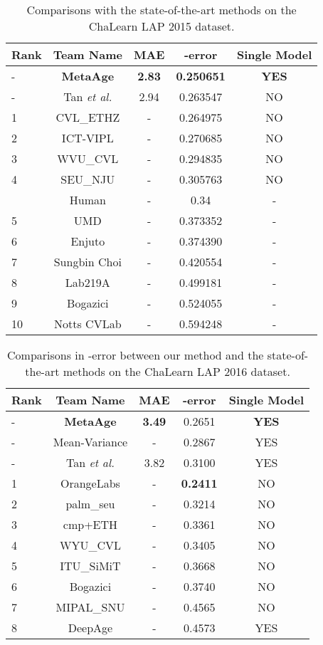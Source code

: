 \documentclass[journal,twoside]{IEEEtran}
\begin{document}
\begin{table}[t]
\caption{Comparisons with the state-of-the-art methods on the ChaLearn LAP 2015 dataset.}
\label{table:rescha15}
\centering
\begin{tabular}{lcccc}
\toprule
Rank & Team Name & MAE & -error & Single Model \\
\midrule
- & \textbf{MetaAge}  & \textbf{2.83} &  \textbf{0.250651} & \textbf{YES} \\
- & Tan \emph{et al.} \cite{tan2017efficient} & 2.94 & 0.263547 & NO \\
\midrule
1 & CVL\_ETHZ \cite{rothe2018deep}  & - & 0.264975   & NO \\
2 & ICT-VIPL \cite{liu2015agenet}  & - & 0.270685 & NO \\
3 & WVU\_CVL \cite{zhu2015study}   & - & 0.294835 &  NO  \\
4 & SEU\_NJU \cite{yang2015deep}  & - &  0.305763 & NO  \\
~ & Human & - & 0.34  & -  \\
5 & UMD &  - & 0.373352 & -  \\
6 & Enjuto  & - & 0.374390 & -\\
7 & Sungbin Choi & - & 0.420554 & - \\
8 & Lab219A & - & 0.499181 & -  \\
9 & Bogazici  & - & 0.524055 & - \\
10 & Notts CVLab & - & 0.594248 & -  \\
\bottomrule
\end{tabular}
\end{table}



\begin{table}[t]
\caption{Comparisons in -error between our method and  the state-of-the-art methods on the ChaLearn LAP 2016 dataset.}
\label{table:rescha16}
\centering
\begin{tabular}{lcccc}
\toprule
Rank  & Team Name  & MAE & -error & Single Model \\
\midrule
- & \textbf{MetaAge} & \textbf{3.49} & 0.2651 & \textbf{YES} \\
- &  Mean-Variance \cite{pan2018mean}& - & 0.2867 & YES \\
- &  Tan \emph{et al.} \cite{tan2017efficient} &  3.82 & 0.3100 & YES \\
\midrule
1 & OrangeLabs \cite{antipov2016apparent} & - & \textbf{0.2411} & NO \\
2 & palm\_seu \cite{huo2016deep} & - & 0.3214 & NO \\
3 & cmp+ETH & - & 0.3361 & NO \\
4 & WYU\_CVL & - & 0.3405 & NO \\
5 & ITU\_SiMiT \cite{can2016apparent} & - &  0.3668 & NO \\
6 & Bogazici \cite{gurpinar2016kernel} & - & 0.3740 & NO  \\
7 & MIPAL\_SNU & - & 0.4565 & NO \\
8 & DeepAge & - & 0.4573 & YES  \\
\bottomrule
\end{tabular}
\end{table}
\end{document}
